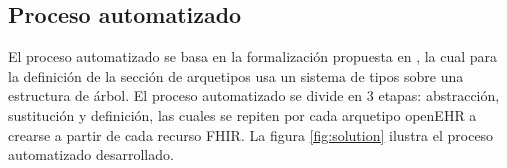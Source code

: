 \subsection{Proceso automatizado}

El proceso automatizado se basa en la formalización propuesta en \cite{Maldonado09}, la cual para la definición de la sección de arquetipos usa un sistema de tipos sobre una estructura de árbol. El proceso automatizado se divide en 3 etapas: abstracción, sustitución y definición, las cuales se repiten por cada arquetipo openEHR a crearse a partir de cada recurso FHIR. La figura \ref{fig:solution} ilustra el proceso automatizado desarrollado.






